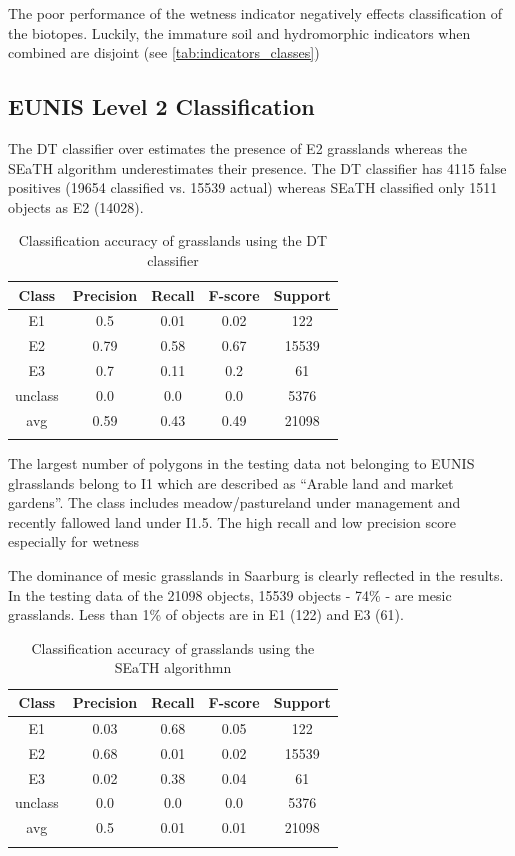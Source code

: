 \documentclass[authoryear, review,12pt,number]{elsarticle}
\begin{document}
The poor performance of the wetness indicator negatively effects classification of the
biotopes. Luckily, the immature soil and hydromorphic indicators when combined
are disjoint (see \ref{tab:indicators_classes})
\subsection{EUNIS Level 2 Classification}
\label{level2_classification}
The DT classifier over estimates the presence of E2 grasslands whereas the SEaTH
algorithm underestimates their presence. The DT classifier has 4115 false
positives (19654 classified vs. 15539 actual) whereas SEaTH classified only 1511
objects as E2 (14028). %
\begin{table}
\begin{tabular}{c c c c c}
Class & Precision & Recall & F-score & Support\\
\hline
E1 & 0.5 & 0.01 & 0.02 & 122\\
E2 & 0.79 & 0.58 & 0.67 & 15539\\
E3 & 0.7 & 0.11 & 0.2 & 61\\
unclass & 0.0 & 0.0 & 0.0 & 5376\\
avg & 0.59 & 0.43 & 0.49 & 21098\\
\label{fig:dt_lvl2_classification}
\end{tabular}
\caption{Classification accuracy of grasslands using the DT classifier}
\end{table}
The largest number of polygons in the testing data not belonging to EUNIS
glrasslands belong to I1 which are described as ``Arable land and
market gardens''. The class includes meadow/pastureland under management and
recently fallowed land under I1.5. The high recall and low precision score
especially for wetness %

The dominance of mesic grasslands in Saarburg is clearly reflected in
the results. In the testing data of the 21098 objects, 15539 objects - 74\% -
are mesic grasslands. Less than 1\% of objects are in E1 (122) and E3 (61). 
\begin{table}
\begin{tabular}{c c c c c}
Class & Precision & Recall & F-score & Support\\
\hline
E1 & 0.03 & 0.68 & 0.05 & 122\\
E2 & 0.68 & 0.01 & 0.02 & 15539\\
E3 & 0.02 & 0.38 & 0.04 & 61\\
unclass & 0.0 & 0.0 & 0.0 & 5376\\
avg & 0.5 & 0.01 & 0.01 & 21098\\
\label{fig:seath_lvl2_classification}
\end{tabular}
\caption{Classification accuracy of grasslands using the SEaTH algorithmn}
\end{table}
\end{document}
